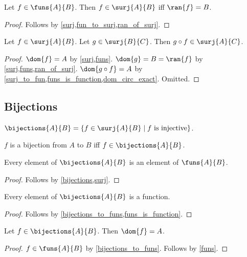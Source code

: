 \begin{corollary}\label{funs_surj_iff}
    Let $f\in\funs{A}{B}$.
    Then $f\in\surj{A}{B}$ iff $\ran{f} = B$.
\end{corollary}
\begin{proof}
    Follows by \cref{surj,fun_to_surj,ran_of_surj}.
\end{proof}

\begin{proposition}\label{surjections_circ}
    Let $f\in\surj{A}{B}$.
    Let $g\in\surj{B}{C}$.
    Then $g\circ f\in\surj{A}{C}$.
\end{proposition}
\begin{proof}
    $\dom{f} = A$ by \cref{surj,funs}.
    $\dom{g} = B = \ran{f}$ by \cref{surj,funs,ran_of_surj}.
    $\dom{g\circ f} = A$ by \cref{surj_to_fun,funs_is_function,dom_circ_exact}.
    Omitted. %
\end{proof}



\subsection{Bijections}

\begin{definition}\label{bijections}
    $\bijections{A}{B} = \{ f\in\surj{A}{B} \mid \text{$f$ is injective}\}$.
\end{definition}

\begin{abbreviation}\label{bijection}
    $f$ is a bijection from $A$ to $B$ iff $f\in\bijections{A}{B}$.
\end{abbreviation}

\begin{proposition}\label{bijections_to_funs}
    Every element of $\bijections{A}{B}$ is an element of $\funs{A}{B}$.
\end{proposition}
\begin{proof}
    Follows by \cref{bijections,surj}.
\end{proof}

\begin{proposition}\label{bijection_is_function}
    Every element of $\bijections{A}{B}$ is a function.
\end{proposition}
\begin{proof}
    Follows by \cref{bijections_to_funs,funs_is_function}.
\end{proof}

\begin{proposition}\label{bijections_dom}
    Let $f\in\bijections{A}{B}$.
    Then $\dom{f} = A$.
\end{proposition}
\begin{proof}
    $f\in\funs{A}{B}$ by \cref{bijections_to_funs}.
    Follows by \cref{funs}.
\end{proof}

